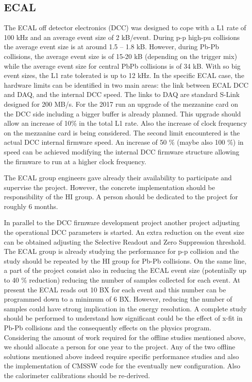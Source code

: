 \subsection{ECAL\label{subsec:ECAL}} 
The ECAL off detector electronics (DCC) was designed to cope with a L1 rate of 100 kHz and an average event size of 2 kB/event. During p-p high-pu collisions the average event size is at around 1.5 – 1.8 kB. However, during Pb-Pb collisions, the average event size is of 15-20 kB (depending on the trigger mix) while the average event size for central PbPb collisions is of 34 kB. With so big event sizes, the L1 rate tolerated is up to 12 kHz. In the specific ECAL case, the hardware limits can be identified in two main areas: the link between ECAL DCC and DAQ, and the internal DCC speed. The links to DAQ are standard S-Link designed for 200 MB/s. For the 2017 run an upgrade of the mezzanine card on the DCC
side including a bigger buffer is already planned. This upgrade should allow an increase of 10\% in the total L1 rate. Also the increase of clock frequency on the mezzanine card is being considered. The second limit encountered is the actual DCC internal firmware speed. An increase of 50 \% (maybe also 100 \%) in speed can be achieved modifying the internal DCC firmware structure allowing the firmware to run at a higher clock frequency. 

The ECAL group engineers gave already their availability to participate and supervise the project. However, the concrete implementation should be responsibility of the HI group. A person should be dedicated to the project for roughly 6 months. 

In parallel to the DCC firmware development project another project adjusting the operational DCC parameters is started. An extra reduction on the event size can be obtained adjusting the Selective Readout and Zero Suppression threshold. The ECAL group is already studying the performance for p-p collision and the study should be repeated by the HI group for Pb-Pb collisions. On the same line, a part of the project consist also in reducing the ECAL event size (potentially up to 40 \% reduction) reducing the number of samples collected for each event. At present the ECAL reads out 10 BX for each event
and this number can be programmed down to a minimum of 6 BX. However, reducing the number of samples could have strong implication in the energy resolution. A complete study should be performed to understand how significant could be the effect of x-fit in Pb-Pb collisions and the consequently effects on the physics program. Considering the amount of work required for the offline studies mentioned above, we should allocate a person for one year to the project. Any of the two offline solutions mentioned above indeed require specific performance studies and also the implementation of CMSSW code for the eventually new configuration. Also the calorimeter calibrations should be re-derived. 




